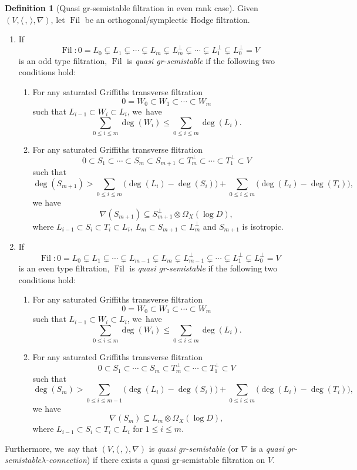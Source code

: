 \documentclass[11pt]{article}
\newcommand{\skpt}{\smallskip}
\numberwithin{equation}{section}
\newcommand{\lconnection}{$\lambda$\nobreakdash-con\-nec\-tion\xspace}
\newcommand{\grsemistable}{gr\nobreakdash-semi\-stable\xspace}
\DeclareMathOperator{\Filt}{Fil}
\theoremstyle{plain}
\theoremstyle{definition}
\newtheorem{defn}[thm]{Definition}
\begin{document}
\skpt
\begin{defn}[Quasi \grsemistable filtration in even rank case]\label{defn_gr_semi_even}
Given $(V,\langle \,, \, \rangle,\nabla)$, let $\Filt$ be an orthogonal/symplectic Hodge filtration. 
\begin{enumerate}
\item If
\[
\Filt: 0= L_0 \subsetneq L_1 \subsetneq \cdots \subsetneq L_m \subsetneq L_m^\perp\subsetneq\cdots \subsetneq L_1^\perp\subsetneq L_0^\perp= V
\]
is an odd type filtration, $\Filt$ is \emph{quasi \grsemistable} if the following two conditions hold: 
\begin{enumerate}\renewcommand{\theenumii}{\Roman{enumii}}
\item\label{cond2:I}
For any saturated Griffiths transverse filtration
\[
0=W_0\subset W_1 \subset \cdots\subset W_m
\]
such that $L_{i-1}\subset W_i\subset L_i$, we~have
\[
\sum_{0\leq i\leq m}\deg(W_i)\leqslant\sum_{0\leq i\leq m}\deg(L_i).
\]

\item\label{cond2:II}
For any saturated Griffiths transverse flitration
\[
0\subset S_1 \subset \cdots\subset S_m\subset S_{m+1}\subset T_m^\perp\subset\cdots \subset T_1^\perp\subset V
\]
such that
\[
\deg(S_{m+1})>\sum_{0\leq i\leq m}\big(\deg(L_i)-\deg(S_i)\big)+\sum_{0\leq i\leq m}\big(\deg(L_i)-\deg(T_i)\big),
\]
we have
\[
\nabla(S_{m+1})\subseteq S_{m+1}^\perp \otimes\Omega_X(\log D),
\]
where $L_{i-1}\subset S_i \subset T_i \subset L_i,\ L_m\subset S_{m+1}\subset L_m^\perp$ and $S_{m+1}$
is isotropic.
\end{enumerate}

\item If
\[
\Filt: 0= L_0 \subsetneq L_1 \subsetneq \cdots\subsetneq L_{m-1} \subsetneq L_m \subsetneq L_{m-1}^\perp\subsetneq\cdots \subsetneq L_1^\perp\subsetneq L_0^\perp= V
\]
is an even type filtration, $\Filt$ is \emph{quasi \grsemistable} if the following two conditions hold:
\begin{enumerate}\renewcommand{\theenumi}{\Roman{enumi}}
\item\label{enum:I}
For any saturated Griffiths transverse filtration
\[
0=W_0\subset W_1 \subset \cdots\subset W_m
\]
such that $L_{i-1}\subset W_i\subset L_i$, we~have
\[
\sum_{0\leq i\leq m}\deg(W_i)\leqslant\sum_{0\leq i\leq m}\deg(L_i).
\]

\item\label{enum:II}
For any saturated Griffiths transverse flitration
\[
0\subset S_1 \subset \cdots\subset S_m\subset T_m^\perp\subset\cdots \subset T_1^\perp\subset V
\]
such that
\[
\deg(S_m)>\sum_{0\leq i\leq m-1}\big(\deg(L_i)-\deg(S_i)\big)+\sum_{0\leq i\leq m}\big(\deg(L_i)-\deg(T_i)\big),
\]
we have
\[
\nabla(S_m)\subseteq L_m \otimes\Omega_X(\log D),
\]
where $L_{i-1}\subset S_i \subset T_i \subset L_i$ for $1\leq i\leq m$.
\end{enumerate}
\end{enumerate}
Furthermore, we~say that $(V,\langle \,, \, \rangle,\nabla)$ is \emph{quasi \grsemistable} (or $\nabla$ is a \emph{quasi \grsemistable \lconnection}) if there exists a quasi \grsemistable filtration on $V$.
\end{defn}
\end{document}
